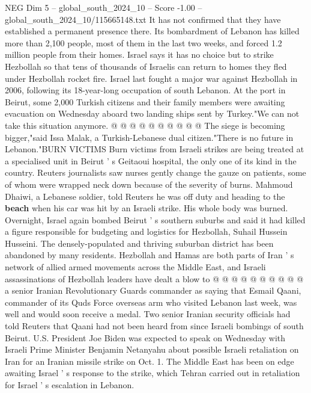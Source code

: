 \begin{textsample}{NEG Dim 5 – global\_south\_2024\_10 – Score -1.00 – global\_south\_2024\_10/115665148.txt}
It has not confirmed that they have established a permanent presence there.
Its bombardment of Lebanon has killed more than 2,100 people, most of them in the last two weeks, and forced 1.2 million people from their homes.
Israel says it has no choice but to strike Hezbollah so that tens of thousands of Israelis can return to homes they fled under Hezbollah rocket fire.
Israel last fought a major war against Hezbollah in 2006, following its 18-year-long occupation of south Lebanon.
At the port in Beirut, some 2,000 Turkish citizens and their family members were awaiting evacuation on Wednesday aboard two landing ships sent by Turkey."We can not take this situation anymore. @ @ @ @ @ @ @ @ @ @ The siege is becoming bigger,"said Issa Malak, a Turkish-Lebanese dual citizen."There is no future in Lebanon."BURN VICTIMS Burn victims from Israeli strikes are being treated at a specialised unit in Beirut ' s Geitaoui hospital, the only one of its kind in the country.
Reuters journalists saw nurses gently change the gauze on patients, some of whom were wrapped neck down because of the severity of burns.
Mahmoud Dhaiwi, a Lebanese soldier, told Reuters he was off duty and heading to the \textbf{beach} when his car was hit by an Israeli strike.
His whole body was burned.
Overnight, Israel again bombed Beirut ' s southern suburbs and said it had killed a figure responsible for budgeting and logistics for Hezbollah, Suhail Hussein Husseini.
The densely-populated and thriving suburban district has been abandoned by many residents.
Hezbollah and Hamas are both parts of Iran ' s network of allied armed movements across the Middle East, and Israeli assassinations of Hezbollah leaders have dealt a blow to @ @ @ @ @ @ @ @ @ @ a senior Iranian Revolutionary Guards commander as saying that Esmail Qaani, commander of its Quds Force overseas arm who visited Lebanon last week, was well and would soon receive a medal.
Two senior Iranian security officials had told Reuters that Qaani had not been heard from since Israeli bombings of south Beirut.
U.S.
President Joe Biden was expected to speak on Wednesday with Israeli Prime Minister Benjamin Netanyahu about possible Israeli retaliation on Iran for an Iranian missile strike on Oct. 1.
The Middle East has been on edge awaiting Israel ' s response to the strike, which Tehran carried out in retaliation for Israel ' s escalation in Lebanon.

\end{textsample}
